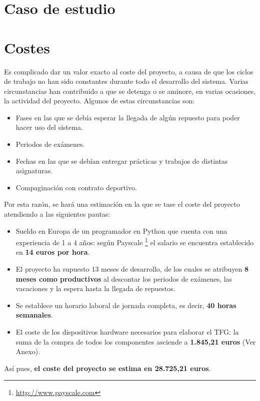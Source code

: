 \section{Caso de estudio}

\section{Costes}

Es complicado dar un valor exacto al coste del proyecto, a causa de que los ciclos de trabajo no han sido constantes durante todo el desarrollo del sistema. Varias circunstancias han contribuido a que se detenga o se aminore, en varias ocasiones, la actividad del proyecto. Algunos de estas circunstancias son:

\begin{itemize}
\item Fases en las que se debía esperar la llegada de algún repuesto para poder hacer uso del sistema.
\item Periodos de exámenes.
\item Fechas en las que se debían entregar prácticas y trabajos de distintas asignaturas.
\item Compaginación con contrato deportivo.
\end{itemize}  

Por esta razón, se hará una estimación en la que se tase el coste del proyecto atendiendo a las siguientes pautas:

\begin{itemize}
\item Sueldo en Europa de un programador en Python que cuenta con una experiencia de 1 a 4 años: según Payscale \footnote{\url{http://www.payscale.com}} el salario se encuentra establecido en \textbf{14 euros por hora}.
\item El proyecto ha supuesto 13 meses de desarrollo, de los cuales se atribuyen \textbf{8 meses como productivos} al descontar los periodos de exámenes, las vacaciones y la espera hasta la llegada de repuestos.
\item Se establece un horario laboral de jornada completa, es decir, \textbf{40 horas semanales}.
\item El coste de los dispositivos hardware necesarios para elaborar el \acs{TFG}: la suma de la compra de todos los componentes asciende a \textbf{1.845,21 euros} (Ver Anexo).
\end{itemize}

Así pues, \textbf{el coste del proyecto se estima en 28.725,21 euros}.

